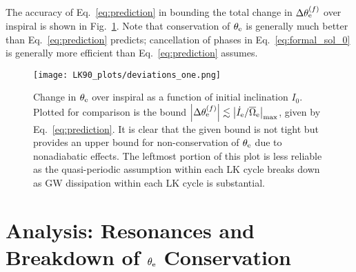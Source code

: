 \documentclass[
        twocolumn,
        twocolappendix
    ]{aastex63}
\newcommand*{\abs}[1]{\left|#1\right|}
\begin{document}
The accuracy of Eq.~\eqref{eq:prediction} in bounding the total change in
$\Delta \theta_{\rm e}^{(f)}$ over inspiral is shown in Fig.~\ref{fig:deviations}.
Note that conservation of $\theta_{\rm e}$ is generally much better than
Eq.~\eqref{eq:prediction} predicts; cancellation of phases in
Eq.~\eqref{eq:formal_sol_0} is generally more
efficient than Eq.~\eqref{eq:prediction} assumes.
\begin{figure}
    \centering
    \texttt{[image: LK90\_plots/deviations\_one.png]}
    \caption{Change in $\theta_{\rm e}$ over inspiral as a function of initial
    inclination $I_0$. Plotted for comparison is the bound $\abs{\Delta
    \theta_{\rm e}^{(f)}} \lesssim \abs{\dot{I}_{\rm e} / \overline{\Omega}_{\rm
    e}}_{\max}$, given by Eq.~\eqref{eq:prediction}. It is clear that the given
    bound is not tight but provides an upper bound for non-conservation of
    $\theta_{\rm e}$ due to nonadiabatic effects. The leftmost portion of this
    plot is less reliable as the quasi-periodic assumption within each LK cycle
    breaks down as GW dissipation within each LK cycle is
    substantial.}\label{fig:deviations}
\end{figure}

\section{Analysis: Resonances and Breakdown of $\theta_{\rm e}$ Conservation
}\label{s:harmonic}
\end{document}
